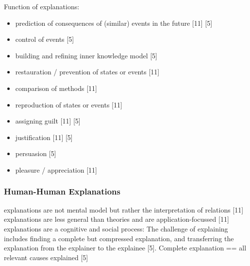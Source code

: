 Function of explanations:\newline
\begin{itemize}
	\item prediction of consequences of (similar) events in the future [11] [5]
	\item control of events  [5]
	\item building and refining inner knowledge model [5]
	\item restauration / prevention of states or events [11]
	\item comparison of methods [11]
	\item reproduction of states or events [11]
	\item assigning guilt [11] [5]
	\item justification [11] [5]
	\item persuasion [5]
	\item pleasure / appreciation [11]
\end{itemize}

\subsubsection{Human-Human Explanations}
explanations are not mental model but rather the interpretation of relations [11]\newline
explanations are less general than theories and are application-focussed [11] \newline
explanations are a cognitive and social process: The challenge of explaining includes finding a complete but compressed explanation, and transferring the explanation from the explainer to the explainee [5].\newline
Complete explanation == all relevant causes explained [5] \newline

